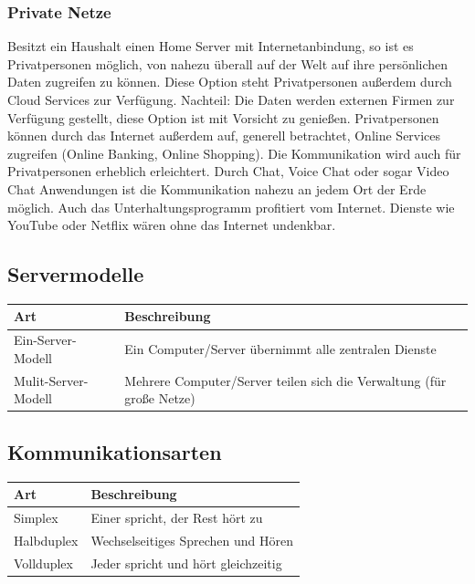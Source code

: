 \documentclass[12pt,a4paper]{article}
\begin{document}
		\subsubsection{Private Netze}
			Besitzt ein Haushalt einen Home Server mit Internetanbindung, so ist es Privatpersonen möglich, von nahezu überall auf der Welt auf ihre persönlichen Daten zugreifen zu können. Diese Option steht Privatpersonen außerdem durch Cloud Services zur Verfügung. Nachteil: Die Daten werden externen Firmen zur Verfügung gestellt, diese Option ist mit Vorsicht zu genießen. Privatpersonen können durch das Internet außerdem auf, generell betrachtet, Online Services zugreifen (Online Banking, Online Shopping). Die Kommunikation wird auch für Privatpersonen erheblich erleichtert. Durch Chat, Voice Chat oder sogar Video Chat Anwendungen ist die Kommunikation nahezu an jedem Ort der Erde möglich. Auch das Unterhaltungsprogramm profitiert vom Internet. Dienste wie YouTube oder Netflix wären ohne das Internet undenkbar.
		
		\subsection{Servermodelle}
		\begin{table}[h]
			\renewcommand{\arraystretch}{1.5}	
			\centering
				\begin{tabularx}{17cm}{|X|X|}
					\hline
					\cellcolor{cyan!60!white}Art&\cellcolor{cyan!60!white}Beschreibung\\
					\hline
					Ein-Server-Modell&Ein Computer/Server übernimmt alle zentralen Dienste \\
					\hline
					Mulit-Server-Modell&Mehrere Computer/Server teilen sich die Verwaltung (für große Netze) \\
					\hline
				\end{tabularx}
		\end{table}
		
		\subsection{Kommunikationsarten}
		\begin{table}[h]
			\renewcommand{\arraystretch}{1.5}	
			\centering
				\begin{tabularx}{17cm}{|X|X|}
					\hline
					\cellcolor{cyan!60!white}Art&\cellcolor{cyan!60!white}Beschreibung\\
					\hline
					Simplex&Einer spricht, der Rest hört zu \\
					\hline
					Halbduplex&Wechselseitiges Sprechen und Hören \\
					\hline
					Vollduplex& Jeder spricht und hört gleichzeitig \\
					\hline
				\end{tabularx}
		\end{table}
		
\end{document}
